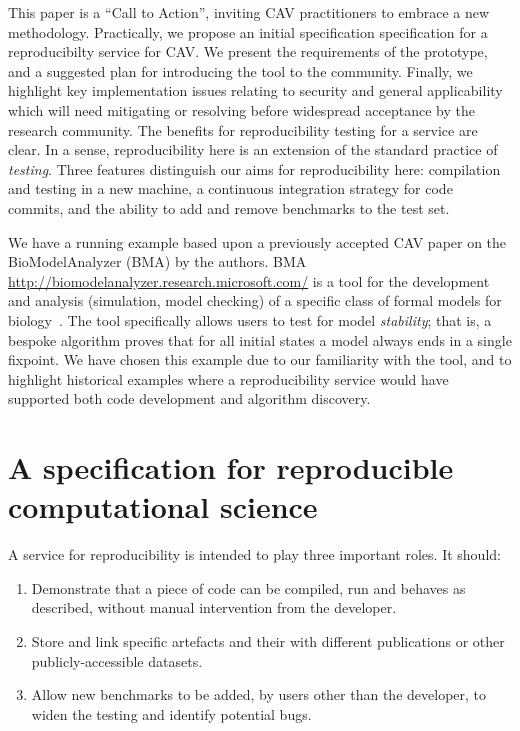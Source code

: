 \documentclass{llncs}
\begin{document}
This paper is a ``Call to Action'', inviting CAV practitioners to
embrace a new methodology. Practically, we propose an initial
specification specification for a reproducibilty service for CAV. We
present the requirements of the prototype, and a suggested plan for
introducing the tool to the community. Finally, we highlight key
implementation issues relating to security and general applicability
which will need mitigating or resolving before widespread acceptance
by the research community.  The benefits for reproducibility testing
for a service are clear. In a sense, reproducibility here is an
extension of the standard practice of \emph{testing}.  Three features
distinguish our aims for reproducibility here: compilation and testing
in a new machine, a continuous integration strategy for code commits,
and the ability to add and remove benchmarks to the test set.

We have a running example based upon a previously accepted CAV paper
on the BioModelAnalyzer (BMA) by the authors.  BMA
\url{http://biomodelanalyzer.research.microsoft.com/} is a tool for
the development and analysis (simulation, model checking) of a
specific class of formal models for
biology~\cite{benque2012,cook-et-al:2010,cook2014}. The tool
specifically allows users to test for model \emph{stability}; that is,
a bespoke algorithm proves that for all initial states a model always
ends in a single fixpoint. We have chosen this example due to our
familiarity with the tool, and to highlight historical examples where
a reproducibility service would have supported both code development
and algorithm discovery.



\section{A specification for reproducible computational science}\label{spec}

A service for reproducibility is intended to play three important roles. It should:
\begin{enumerate}
	\item Demonstrate that a piece of code can be compiled, run and behaves as described,
		without manual intervention from the developer.
	\item Store and link specific artefacts and their with different publications
		or other publicly-accessible datasets.
	\item Allow new benchmarks to be added, by users other than the developer, to 
		widen the testing and identify potential bugs.
\end{enumerate}
\end{document}
